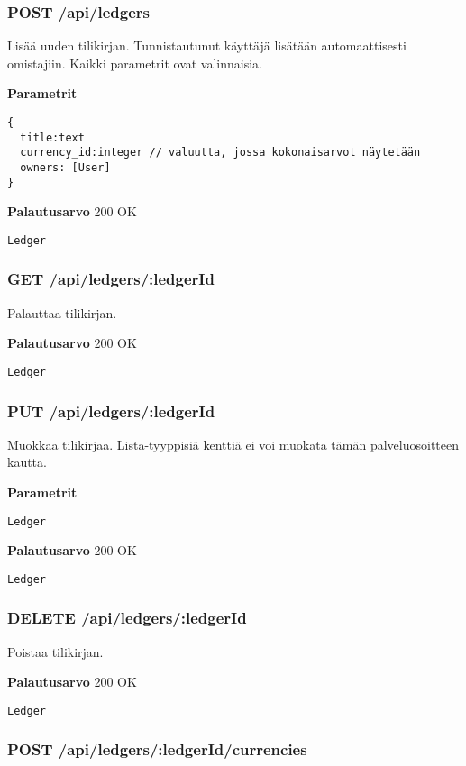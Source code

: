 \subsubsection{POST /api/ledgers}
Lisää uuden tilikirjan. Tunnistautunut käyttäjä lisätään automaattisesti
omistajiin. Kaikki parametrit ovat valinnaisia.

\textbf{Parametrit}
\begin{Verbatim}
{
  title:text
  currency_id:integer // valuutta, jossa kokonaisarvot näytetään
  owners: [User]
}
\end{Verbatim}

\textbf{Palautusarvo}
200 OK
\begin{Verbatim}
Ledger
\end{Verbatim}

\subsubsection{GET /api/ledgers/:ledgerId}

Palauttaa tilikirjan.

\textbf{Palautusarvo}
200 OK
\begin{Verbatim}
Ledger
\end{Verbatim}

\subsubsection{PUT /api/ledgers/:ledgerId}

Muokkaa tilikirjaa. Lista-tyyppisiä kenttiä ei voi muokata tämän
palveluosoitteen kautta.

\textbf{Parametrit}
\begin{Verbatim}
Ledger
\end{Verbatim}

\textbf{Palautusarvo}
200 OK
\begin{Verbatim}
Ledger
\end{Verbatim}

\subsubsection{DELETE /api/ledgers/:ledgerId}

Poistaa tilikirjan.

\textbf{Palautusarvo}
200 OK
\begin{Verbatim}
Ledger
\end{Verbatim}

\subsubsection{POST /api/ledgers/:ledgerId/currencies}

